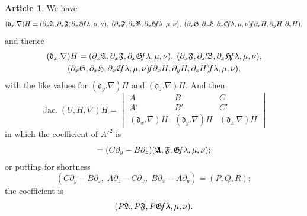 \documentclass[12pt,a4paper]{article}
\theoremstyle{definition}
\newtheorem{art}{Article}[section]
\DeclareMathOperator{\Jac}{Jac.}
\begin{document}
\begin{art}
We have
\[
(\mathfrak{d}_x.\nabla)H = (\partial_x\mathfrak{A}, \partial_x\mathfrak{F}, \partial_x\mathfrak{G} \hspace{-2pt} f\lambda, \mu, \nu), \; (\partial_x\mathfrak{F}, \partial_x\mathfrak{B}, \partial_x\mathfrak{H} \hspace{-2pt} f\lambda, \mu, \nu), \; (\partial_x\mathfrak{G}, \partial_x\mathfrak{H}, \partial_x\mathfrak{C} \hspace{-2pt} f\lambda, \mu, \nu) \hspace{-2pt} f\partial_x H, \partial_y H, \partial_z H),
\]
and thence
\begin{multline*}
(\mathfrak{d}_x.\nabla)H = (\partial_x\mathfrak{A}, \partial_x\mathfrak{F}, \partial_x\mathfrak{G} \hspace{-2pt} f\lambda, \mu, \nu), \; (\partial_x\mathfrak{F}, \partial_x\mathfrak{B}, \partial_x\mathfrak{H} \hspace{-2pt} f\lambda, \mu, \nu), \\
(\partial_x\mathfrak{G}, \partial_x\mathfrak{H}, \partial_x\mathfrak{C} \hspace{-2pt} f\lambda, \mu, \nu) \hspace{-2pt} f\partial_x H, \partial_y H, \partial_z H) \hspace{-2pt} f\lambda, \mu, \nu),
\end{multline*}
with the like values for $(\mathfrak{d}_y.\nabla)H$ and $(\mathfrak{d}_z.\nabla)H$. And then
\[
\Jac(U, H, \nabla)H = \begin{vmatrix} A & B & C \\ A' & B' & C' \\ (\mathfrak{d}_x.\nabla)H & (\mathfrak{d}_y.\nabla)H & (\mathfrak{d}_z.\nabla)H \end{vmatrix}
\]
in which the coefficient of $A'^2$ is
\[
= (C\partial_y - B\partial_z)(\mathfrak{A}, \mathfrak{F}, \mathfrak{G} \hspace{-2pt} f\lambda, \mu, \nu);
\]
or putting for shortness
\[
(C\partial_y - B\partial_z, \; A\partial_z - C\partial_x, \; B\partial_x - A\partial_y) = (P, Q, R);
\]
the coefficient is
\[
(P\mathfrak{A}, P\mathfrak{F}, P\mathfrak{G} \hspace{-2pt} f\lambda, \mu, \nu).
\]
\end{art}
\end{document}
